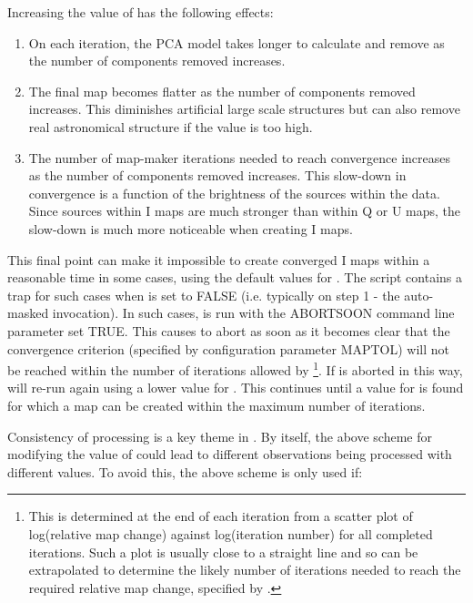 \documentclass[twoside,11pt]{starlink}
\begin{document}
Increasing the value of  has the following effects:

\begin{enumerate}
\item On each iteration, the PCA model takes longer to calculate and remove
as the number of components removed increases.
\item The final map becomes flatter as the number of components removed
increases. This diminishes artificial large scale structures but can also
remove real astronomical structure if the value is too high.
\item The number of map-maker iterations needed to reach convergence
increases as the number of components removed increases. This slow-down
in convergence is a function of the brightness of the sources within the
data. Since sources within I maps are much stronger than within Q or U
maps, the slow-down is much more noticeable when creating I maps.
\end{enumerate}

This final point can make it impossible to create converged I maps within
a reasonable time in some cases, using the default values for
. The \ptmap script contains a trap for such cases when
 is set to FALSE (i.e. typically on step 1 - the auto-masked
invocation). In such cases, \mmap is run with the ABORTSOON command line
parameter set TRUE. This causes \mmap to abort as soon as it becomes
clear that the convergence criterion (specified by configuration parameter
MAPTOL) will not be reached within the number of iterations allowed by
\footnote{This is determined at the end of each iteration from
a scatter plot of log(relative map change) against log(iteration number)
for all completed iterations. Such a plot is usually close to a straight
line and so can be extrapolated to determine the likely number of
iterations needed to reach the required relative map change, specified by
.}. If \mmap is aborted in this way, \ptmap will re-run \mmap
again using a lower value for . This continues until a
value for  is found for which a map can be created
within the maximum number of iterations.

Consistency of processing is a key theme in \ptmap. By itself, the above
scheme for modifying the value of  could lead to
different observations being processed with different values. To avoid
this, the above scheme is only used if:
\end{document}
